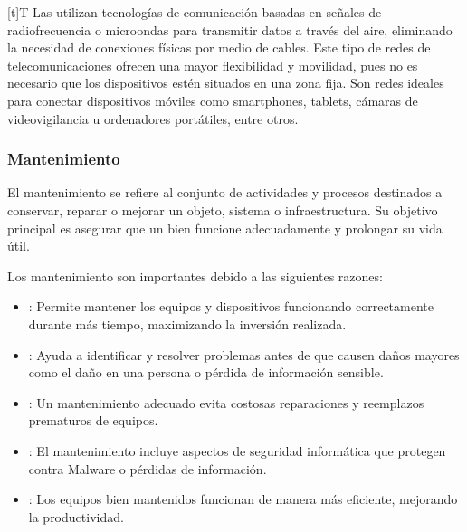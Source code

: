 \documentclass[letterpaper,10pt,spanish]{sphinxmanual}
\begin{document}
\begin{savenotes}\sphinxattablestart
\sphinxthistablewithglobalstyle
\centering
\begin{tabulary}{\linewidth}[t]{T}
\sphinxtoprule
\sphinxtableatstartofbodyhook
\sphinxAtStartPar
Las  utilizan tecnologías de comunicación basadas en señales de radiofrecuencia o microondas para transmitir datos a través del aire, eliminando la necesidad de conexiones físicas por medio de cables.  Este tipo de redes de telecomunicaciones ofrecen una mayor flexibilidad y movilidad, pues no es necesario que los dispositivos estén situados en una zona fija. Son redes ideales para conectar dispositivos móviles como smartphones, tablets, cámaras de video\sphinxhyphen{}vigilancia u ordenadores portátiles, entre otros.
\\
\sphinxbottomrule
\end{tabulary}
\sphinxtableafterendhook\par
\sphinxattableend\end{savenotes}


\subsubsection{Mantenimiento}
\label{\detokenize{1_guias/10informatica/G1009:mantenimiento}}
\sphinxAtStartPar
El mantenimiento se refiere al conjunto de actividades y procesos destinados a conservar, reparar o mejorar un objeto, sistema o infraestructura. Su objetivo principal es asegurar que un bien funcione adecuadamente y prolongar su vida útil.

\sphinxAtStartPar
Los mantenimiento son importantes debido a las siguientes razones:
\begin{itemize}
\item {} 
\sphinxAtStartPar
{}: Permite mantener los equipos y dispositivos funcionando correctamente durante más tiempo, maximizando la inversión realizada.

\item {} 
\sphinxAtStartPar
{}: Ayuda a identificar y resolver problemas antes de que causen daños mayores como el daño en una persona o pérdida de información sensible.

\item {} 
\sphinxAtStartPar
{}: Un mantenimiento adecuado evita costosas reparaciones y reemplazos prematuros de equipos.

\item {} 
\sphinxAtStartPar
{}: El mantenimiento incluye aspectos de seguridad informática que protegen contra Malware o pérdidas de información.

\item {} 
\sphinxAtStartPar
{}: Los equipos bien mantenidos funcionan de manera más eficiente, mejorando la productividad.

\end{itemize}
\end{document}
